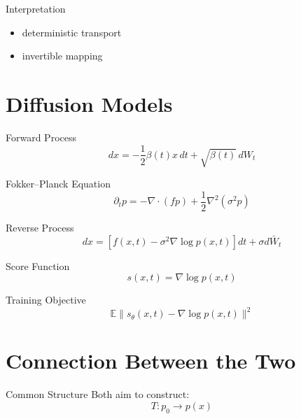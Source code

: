 \documentclass{beamer}
\begin{document}
\begin{frame}{Interpretation}
\begin{itemize}
\item deterministic transport
\item invertible mapping
\end{itemize}
\end{frame}

\section{Diffusion Models}

\begin{frame}{Forward Process}
\[
dx = -\frac{1}{2}\beta(t)x\,dt + \sqrt{\beta(t)}\,dW_t
\]
\end{frame}


\begin{frame}{Fokker–Planck Equation}
\[
\partial_t p = -\nabla \cdot (f p) + \frac{1}{2}\nabla^2 (\sigma^2 p)
\]
\end{frame}


\begin{frame}{Reverse Process}
\[
dx = [f(x,t) - \sigma^2 \nabla \log p(x,t)]dt + \sigma d\bar{W}_t
\]
\end{frame}


\begin{frame}{Score Function}
\[
s(x,t) = \nabla \log p(x,t)
\]
\end{frame}


\begin{frame}{Training Objective}
\[
\mathbb{E}\|s_\theta(x,t) - \nabla \log p(x,t)\|^2
\]
\end{frame}

\section{Connection Between the Two}

\begin{frame}{Common Structure}
Both aim to construct:
\[
T: p_0 \rightarrow p(x)
\]
\end{frame}
\end{document}
